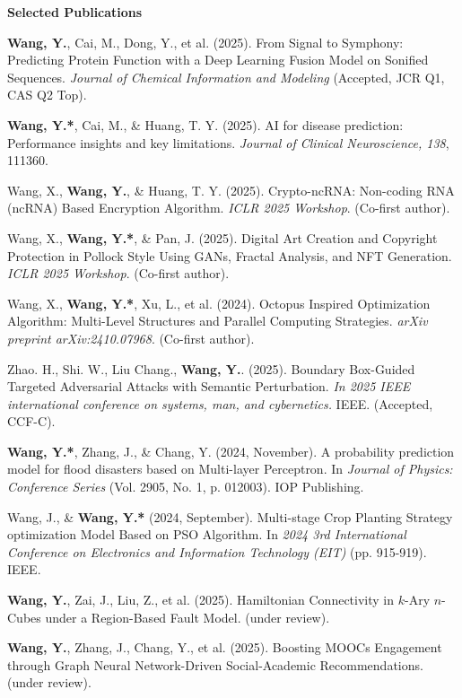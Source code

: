 \documentclass[11pt]{article}
\begin{document}
	\begin{center}
		\textbf{\large Selected Publications}
	\end{center}
	\begin{enumerate}[noitemsep, topsep=0pt, partopsep=0pt, parsep=0pt, leftmargin=*, label={[\arabic*]}]
		\item \textbf{Wang, Y.}, Cai, M., Dong, Y., et al. (2025). From Signal to Symphony: Predicting Protein Function with a Deep Learning Fusion Model on Sonified Sequences. \textit{Journal of Chemical Information and Modeling} (Accepted, JCR Q1, CAS Q2 Top).
		\item \textbf{Wang, Y.*}, Cai, M., \& Huang, T. Y. (2025). AI for disease prediction: Performance insights and key limitations. \textit{Journal of Clinical Neuroscience, 138}, 111360.
		\item Wang, X., \textbf{Wang, Y.}, \& Huang, T. Y. (2025). Crypto-ncRNA: Non-coding RNA (ncRNA) Based Encryption Algorithm. \textit{ICLR 2025 Workshop}. (Co-first author).
		\item Wang, X., \textbf{Wang, Y.*}, \& Pan, J. (2025). Digital Art Creation and Copyright Protection in Pollock Style Using GANs, Fractal Analysis, and NFT Generation. \textit{ICLR 2025 Workshop}. (Co-first author).
		\item Wang, X., \textbf{Wang, Y.*}, Xu, L., et al. (2024). Octopus Inspired Optimization Algorithm: Multi-Level Structures and Parallel Computing Strategies. \textit{arXiv preprint arXiv:2410.07968}. (Co-first author).
		\item Zhao. H., Shi. W., Liu Chang., \textbf{Wang, Y.}. (2025). Boundary Box-Guided Targeted Adversarial Attacks with Semantic Perturbation. \textit{In 2025 IEEE international conference on systems, man, and cybernetics.} IEEE.  (Accepted, CCF-C).
		\item \textbf{Wang, Y.*}, Zhang, J., \& Chang, Y. (2024, November). A probability prediction model for flood disasters based on Multi-layer Perceptron. In \textit{Journal of Physics: Conference Series} (Vol. 2905, No. 1, p. 012003). IOP Publishing.
		\item Wang, J., \& \textbf{Wang, Y.*} (2024, September). Multi-stage Crop Planting Strategy optimization Model Based on PSO Algorithm. In \textit{2024 3rd International Conference on Electronics and Information Technology (EIT)} (pp. 915-919). IEEE.
		\item \textbf{Wang, Y.}, Zai, J., Liu, Z., et al. (2025). Hamiltonian Connectivity in $k$-Ary $n$-Cubes under a Region-Based Fault Model. (under review).
		\item \textbf{Wang, Y.}, Zhang, J., Chang, Y., et al. (2025). Boosting MOOCs Engagement through Graph Neural Network-Driven Social-Academic Recommendations. (under review).
	\end{enumerate}
	
\end{document}

